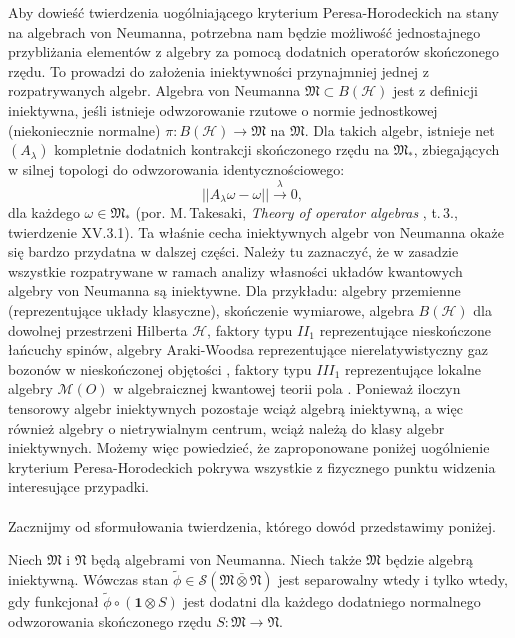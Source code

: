 Aby dowieść twierdzenia uogólniającego kryterium Peresa-Horodeckich
na stany na algebrach von Neumanna,
potrzebna nam będzie możliwość jednostajnego przybliżania elementów z algebry
za pomocą dodatnich operatorów skończonego rzędu.
To prowadzi do założenia iniektywności przynajmniej jednej z rozpatrywanych algebr.
\label{def:injectivevNalg}
Algebra von Neumanna $\mathfrak{M}\subset B(\mathcal{H})$ jest z definicji iniektywna,
jeśli istnieje odwzorowanie rzutowe o normie jednostkowej (niekoniecznie normalne)
$\pi :B(\mathcal{H})\to\mathfrak{M}$ na $\mathfrak{M}$.
Dla takich algebr, istnieje net $(A_{\lambda})$ kompletnie dodatnich
kontrakcji skończonego rzędu na  $\mathfrak{M}_*$,
zbiegających w silnej topologi do odwzorowania identycznościowego:
\begin{equation}
\label{RandomLabel:513684}
 || A_{\lambda} \omega - \omega || \stackrel{\lambda}{\longrightarrow} 0, \quad
\end{equation}
dla każdego $\omega \in \mathfrak{M}_{*}$
(por. M.\,Takesaki, \emph{Theory of operator algebras}  \cite{Takesaki3},
\mbox{t.\,3.}, twierdzenie XV.3.1).
Ta właśnie cecha iniektywnych algebr von Neumanna okaże się bardzo przydatna
w dalszej części.
Należy tu zaznaczyć, że w zasadzie wszystkie rozpatrywane w ramach analizy
własności układów kwantowych algebry von Neumanna są iniektywne.
Dla przykładu: algebry przemienne (reprezentujące układy klasyczne),
skończenie wymiarowe,
algebra $B(\mathcal{H})$ dla dowolnej przestrzeni Hilberta $\mathcal{H}$,
faktory typu $II_1$ reprezentujące nieskończone łańcuchy spinów,
algebry Araki-Woodsa reprezentujące nierelatywistyczny gaz bozonów w nieskończonej objętości
\cite{araki1968classification},
faktory typu $III_1$ reprezentujące lokalne algebry $\mathcal{M}(O)$
w algebraicznej kwantowej teorii pola \cite{yngwason2005role}.
Ponieważ iloczyn tensorowy algebr iniektywnych pozostaje wciąż algebrą iniektywną,
a więc również algebry o nietrywialnym centrum, wciąż należą do klasy algebr iniektywnych.
Możemy więc powiedzieć, że zaproponowane poniżej uogólnienie kryterium Peresa-Horodeckich
pokrywa wszystkie z fizycznego punktu widzenia interesujące przypadki.

\paragraph{}
Zacznijmy od sformułowania twierdzenia, którego dowód przedstawimy poniżej.

\begin{Theorem}
    \label{thm:PHcrit}
    Niech $\mathfrak{M}$ i  $\mathfrak{N}$ będą algebrami von Neumanna.
    Niech także  $\mathfrak{M}$ będzie algebrą iniektywną.
    Wówczas stan $\tilde{\phi} \in \mathcal{S}(\mathfrak{M} \bar{\otimes} \mathfrak{N})$
    jest separowalny wtedy i tylko wtedy, gdy funkcjonał
    $\tilde{\phi} \circ (\mathbf{1} \otimes S)$
    jest dodatni dla każdego dodatniego normalnego odwzorowania skończonego rzędu
    $S\!: \mathfrak{M} \rightarrow \mathfrak{N}$.
\end{Theorem}

